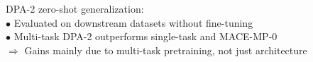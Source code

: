 \documentclass[preview]{standalone}
\begin{document}
\begin{center}
DPA-2 zero-shot generalization: \\
            $\bullet$ Evaluated on downstream datasets without fine-tuning \\
            $\bullet$ Multi-task DPA-2 outperforms single-task and MACE-MP-0 \\
            $\Rightarrow$ Gains mainly due to multi-task pretraining, not just architecture
\end{center}
\end{document}
